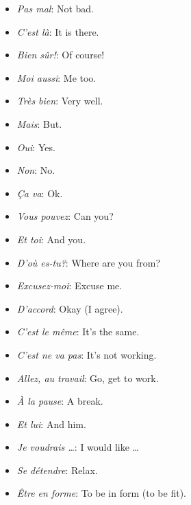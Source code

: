 \begin{itemize}
\item{\emph{Pas mal}: Not bad.}

\item{\emph{C'est l\`a}: It is there.}

\item{\emph{Bien s\^ur!}: Of course!}

\item{\emph{Moi aussi}: Me too.}

\item{\emph{Tr\`es bien}: Very well.}

\item{\emph{Mais}: But.}

\item{\emph{Oui}: Yes.}

\item{\emph{Non}: No.}

\item{\emph{\c{C}a va}: Ok.}

\item{\emph{Vous pouvez}: Can you?}

\item{\emph{Et toi}: And you.}

\item{\emph{D'o\`u es-tu?}: Where are you from?}

\item{\emph{Excusez-moi}: Excuse me.}

\item{\emph{D'accord}: Okay (I agree).}

\item{\emph{C'est le m\^eme}: It's the same.}

\item{\emph{C'est ne va pas}: It's not working.}

\item{\emph{Allez, au travail}: Go, get to work.}

\item{\emph{\`A la pause}: A break.}

\item{\emph{Et lui}: And him.}

\item{\emph{Je voudrais \dots}: I would like \dots}

\item{\emph{Se d\'etendre}: Relax.}

\item{\emph{\^Etre en forme}: To be in form (to be fit).}


\end{itemize}
